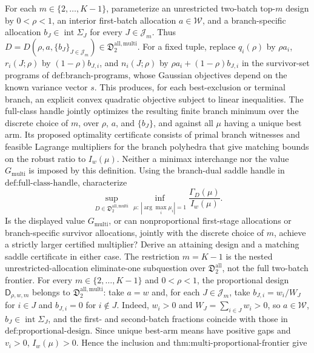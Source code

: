 For each \(m\in\{2,\ldots,K-1\}\), parameterize an unrestricted two-batch top-\(m\) design by \(0<\rho<1\), an interior first-batch allocation \(a\in\mathcal W\), and a branch-specific allocation \(b_J\in\operatorname{int}\Sigma_J\) for every \(J\in\mathcal J_m\).  Thus \(D=D(\rho,a,\{b_J\}_{J\in\mathcal J_m})\in\mathfrak D_2^{\mathrm{all,multi}}\).  For a fixed tuple, replace \(q_i(\rho)\) by \(\rho a_i\), \(r_i(J;\rho)\) by \((1-\rho)b_{J,i}\), and \(n_i(J;\rho)\) by \(\rho a_i+(1-\rho)b_{J,i}\) in the survivor-set programs of \(\text{def:branch-programs}\), whose Gaussian objectives depend on the known variance vector \(s\).  This produces, for each best-exclusion or terminal branch, an explicit convex quadratic objective subject to linear inequalities.  The full-class handle jointly optimizes the resulting finite branch minimum over the discrete choice of \(m\), over \(\rho\), \(a\), and \(\{b_J\}\), and against all \(\mu\) having a unique best arm.  Its proposed optimality certificate consists of primal branch witnesses and feasible Lagrange multipliers for the branch polyhedra that give matching bounds on the robust ratio to \(I_w(\mu)\).  Neither a minimax interchange nor the value \(G_{\mathrm{multi}}\) is imposed by this definition.
Using the branch-dual saddle handle in \(\text{def:full-class-handle}\), characterize
\[
 \sup_{D\in\mathfrak D_2^{\mathrm{all,multi}}}
 \inf_{\mu:\,|\arg\max_i\mu_i|=1}
 \frac{\Gamma_D(\mu)}{I_w(\mu)}.
\]
Is the displayed value \(G_{\mathrm{multi}}\), or can nonproportional first-stage allocations or branch-specific survivor allocations, jointly with the discrete choice of \(m\), achieve a strictly larger certified multiplier?  Derive an attaining design and a matching saddle certificate in either case.  The restriction \(m=K-1\) is the nested unrestricted-allocation eliminate-one subquestion over \(\mathfrak D_2^{\mathrm{all}}\), not the full two-batch frontier.
For every \(m\in\{2,\ldots,K-1\}\) and \(0<\rho<1\), the proportional design \(\mathsf D_{\rho,w,m}\) belongs to \(\mathfrak D_2^{\mathrm{all,multi}}\): take \(a=w\) and, for each \(J\in\mathcal J_m\), take \(b_{J,i}=w_i/W_J\) for \(i\in J\) and \(b_{J,i}=0\) for \(i\notin J\).  Indeed, \(w_i>0\) and \(W_J=\sum_{i\in J}w_i>0\), so \(a\in\mathcal W\), \(b_J\in\operatorname{int}\Sigma_J\), and the first- and second-batch fractions coincide with those in \(\text{def:proportional-design}\).  Since unique best-arm means have positive gaps and \(v_i>0\), \(I_w(\mu)>0\).  Hence the inclusion and \(\text{thm:multi-proportional-frontier}\) give
